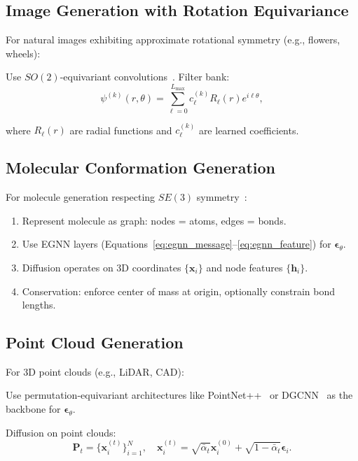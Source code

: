 \documentclass[12pt]{report}
\theoremstyle{definition}
\begin{document}
\subsection{Image Generation with Rotation Equivariance}

For natural images exhibiting approximate rotational symmetry (e.g., flowers, wheels):

Use $SO(2)$-equivariant convolutions~\citep{weiler2018learning}. Filter bank:
\begin{equation}
\psi^{(k)}(r, \theta) = \sum_{\ell=0}^{L_{\max}} c_{\ell}^{(k)} R_\ell(r) e^{i\ell\theta},
\label{eq:so2_filter}
\end{equation}

where $R_\ell(r)$ are radial functions and $c_{\ell}^{(k)}$ are learned coefficients.

\subsection{Molecular Conformation Generation}

For molecule generation respecting $SE(3)$ symmetry~\citep{hoogeboom2022equivariant}:

\begin{enumerate}
\item Represent molecule as graph: nodes = atoms, edges = bonds.
\item Use EGNN layers (Equations~\ref{eq:egnn_message}--\ref{eq:egnn_feature}) for $\boldsymbol{\epsilon}_\theta$.
\item Diffusion operates on 3D coordinates $\{\mathbf{x}_i\}$ and node features $\{\mathbf{h}_i\}$.
\item Conservation: enforce center of mass at origin, optionally constrain bond lengths.
\end{enumerate}

\subsection{Point Cloud Generation}

For 3D point clouds (e.g., LiDAR, CAD):

Use permutation-equivariant architectures like PointNet++~\citep{qi2017pointnet++} or DGCNN~\citep{wang2019dynamic} as the backbone for $\boldsymbol{\epsilon}_\theta$.

Diffusion on point clouds:
\begin{equation}
\mathbf{P}_t = \{\mathbf{x}_i^{(t)}\}_{i=1}^N, \quad \mathbf{x}_i^{(t)} = \sqrt{\bar{\alpha}_t}\mathbf{x}_i^{(0)} + \sqrt{1-\bar{\alpha}_t}\boldsymbol{\epsilon}_i.
\label{eq:point_cloud_diffusion}
\end{equation}
\end{document}
